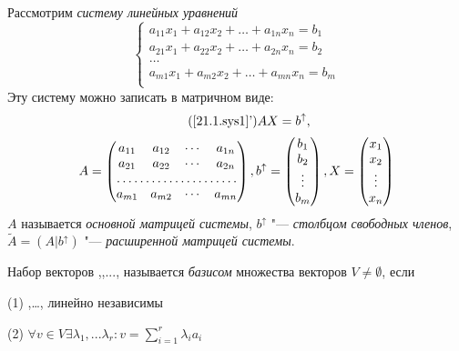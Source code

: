Рассмотрим \textit{систему линейных уравнений}
\begin{equation}\label{21.1.sys1}
\left\lbrace\begin{array}{crl}
a_{11}x_1+a_{12}x_2+\ldots+a_{1n}x_n=b_1\\
a_{21}x_1+a_{22}x_2+\ldots+a_{2n}x_n=b_2\\
\ldots \\
a_{m1}x_1+a_{m2}x_2+\ldots+a_{mn}x_n=b_m\\ 
\end{array}\right.\end{equation}
Эту систему можно записать в матричном виде:
\begin{equation*}\tag{\ref{21.1.sys1}'}
AX=b^{\uparrow},
\end{equation*}
\begin{equation*}
A=\begin{pmatrix}
a_{11} & a_{12} & \cdots & a_{1n} \\
a_{21} & a_{22} & \cdots & a_{2n} \\
\hdotsfor{4} \\
a_{m1} & a_{m2} & \cdots & a_{mn} \\
\end{pmatrix},
b^\uparrow=\begin{pmatrix}
b_1 \\ b_2 \\ \vdots \\ b_m \\
\end{pmatrix},
X=\begin{pmatrix}
x_1 \\ x_2 \\ \vdots \\ x_n \\
\end{pmatrix}
\end{equation*}
$A$ называется \textit{основной матрицей системы}, $b^\uparrow$ "--- \textit{столбцом свободных членов}, $\widetilde A = (A|b^\uparrow)$ "--- \textit{расширенной матрицей системы}.
\begin{defn}
Набор векторов ,,..., называется \textit{базисом} множества векторов $V\neq \emptyset$, если

(1) ,\ldots, линейно независимы

(2) $\forall v \in V \exists \lambda_1,...\lambda_r: v=\sum \limits_{i=1}^r\lambda_ia_i$
\end{defn}

